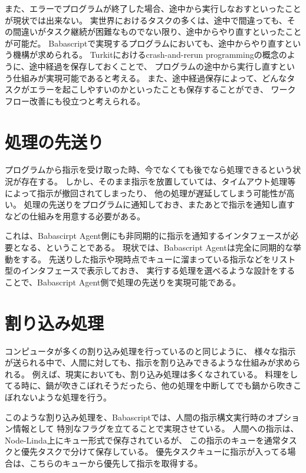 また、エラーでプログラムが終了した場合、途中から実行しなおすといったことが現状では出来ない。
実世界におけるタスクの多くは、途中で間違っても、その間違いがタスク継続が困難なものでない限り、途中からやり直すといったことが可能だ。
Babascriptで実現するプログラムにおいても、途中からやり直すという機構が求められる。
Turkit\cite{turkit}におけるcrash-and-rerun
programmingの概念のように、途中経過を保存しておくことで、
プログラムの途中から実行し直すという仕組みが実現可能であると考える。
また、途中経過保存によって、どんなタスクがエラーを起こしやすいのかといったことも保存することができ、
ワークフロー改善にも役立つと考えられる。

\section{処理の先送り}\label{ux51e6ux7406ux306eux5148ux9001ux308a}

プログラムから指示を受け取った時、今でなくても後でなら処理できるという状況が存在する。
しかし、そのまま指示を放置していては、タイムアウト処理等によって指示が撤回されてしまったり、
他の処理が遅延してしまう可能性が高い。
処理の先送りをプログラムに通知しておき、またあとで指示を通知し直すなどの仕組みを用意する必要がある。

これは、Babascirpt
Agent側にも非同期的に指示を通知するインタフェースが必要となる、ということである。
現状では、Babascript Agentは完全に同期的な挙動をする。
先送りした指示や現時点でキューに溜まっている指示などをリスト型のインタフェースで表示しておき、
実行する処理を選べるような設計をすることで、Babascript
Agent側で処理の先送りを実現可能である。

\section{割り込み処理}\label{ux5272ux308aux8fbcux307fux51e6ux7406}

コンピュータが多くの割り込み処理を行っているのと同じように、
様々な指示が送られる中で、人間に対しても、指示を割り込みできるような仕組みが求められる。
例えば、現実においても、割り込み処理は多くなされている。
料理をしてる時に、鍋が吹きこぼれそうだったら、他の処理を中断してでも鍋から吹きこぼれないような処理を行う。

このような割り込み処理を、Babascriptでは、人間の指示構文実行時のオプション情報として
特別なフラグを立てることで実現させている。
人間への指示は、Node-Linda上にキュー形式で保存されているが、
この指示のキューを通常タスクと優先タスクで分けて保存している。
優先タスクキューに指示が入ってる場合は、こちらのキューから優先して指示を取得する。

